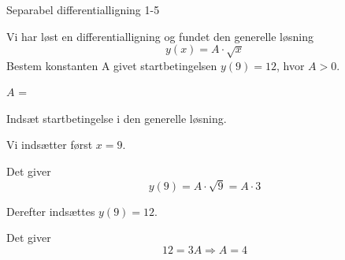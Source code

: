 \documentclass{article}
\begin{document}
\begin{exercise}{Separabel differentialligning 1-5}
	
	
	Vi har løst en differentialligning og fundet den generelle løsning
	\[
	y(x) =  A \cdot \sqrt{x}
	\]
	Bestem konstanten A givet startbetingelsen $y(9)=12$, hvor $A>0$.
	
	$A$ = 
	
	\hint
	
	Indsæt startbetingelse i den generelle løsning. 
	
	
	\hint
	
	Vi indsætter først $x=9$.
	
	\hint
	
	Det giver
	\[
	y(9)=  A \cdot \sqrt{9} = A	\cdot 3
	\]
	
	\hint
	
	Derefter indsættes $y(9)=12$.
	
	\hint 
	
	Det giver 
	\[
	12  = 3A  \Rightarrow A = 4
	\]
	
\end{exercise}
\end{document}
